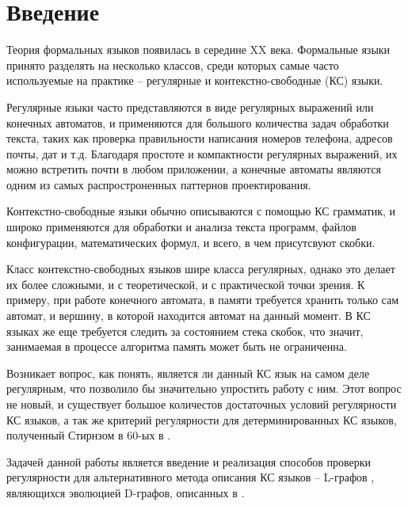 \chapter*{Введение} \label{chapter0}

Теория формальных языков появилась в середине XX века. 
Формальные языки принято разделять на несколько классов, среди которых самые часто используемые на практике -- 
регулярные и контекстно-свободные (КС) языки. 

Регулярные языки часто представляются в виде регулярных выражений или
конечных автоматов, и применяются для большого количества задач обработки текста, 
таких как проверка правильности написания номеров телефона, адресов почты, дат и т.д.
Благодаря простоте и компактности регулярных выражений, их можно встретить почти в любом
приложении, а конечные автоматы являются одним из самых распростроненных паттернов проектирования.

Контекстно-свободные языки обычно описываются с помощью КС грамматик,
и широко применяются для обработки и анализа текста программ, файлов конфигурации, математических
формул, и всего, в чем присутсвуют скобки.

Класс контекстно-свободных языков шире класса регулярных, однако это делает их более сложными,
и с теоретической, и с практической точки зрения. К примеру, при работе конечного автомата,
в памяти требуется хранить только сам автомат, и вершину, в которой находится автомат на данный 
момент. В КС языках же еще требуется следить за состоянием стека скобок,
что значит, занимаемая в процессе алгоритма память может быть не ограниченна. 

Возникает вопрос, как понять, является ли данный КС язык на самом деле регулярным, что позволило бы
значительно упростить работу с ним. Этот вопрос не новый, и существует большое количестов
достаточных условий регулярности КС языков, а так же критерий регулярности для детерминированных КС
языков, полученный Стирнзом в 60-ых в \cite{stearns_reg}.

Задачей данной работы является введение и реализация способов проверки регулярности для альтернативного 
метода описания КС языков -- L-графов \cite{vylitok_rostovski_o_podklassah,vylitok_sutirin_harakterizacia}, являющихся эволюцией D-графов, описанных в \cite{stan1}.


\clearpage
